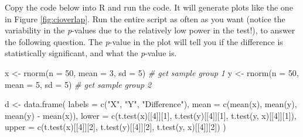 \documentclass[
]{krantz}
\newenvironment{Shaded}{\begin{snugshade}}{\end{snugshade}}
\newcommand{\AttributeTok}[1]{\textcolor[rgb]{0.77,0.63,0.00}{#1}}
\newcommand{\CommentTok}[1]{\textcolor[rgb]{0.56,0.35,0.01}{\textit{#1}}}
\newcommand{\DecValTok}[1]{\textcolor[rgb]{0.00,0.00,0.81}{#1}}
\newcommand{\FunctionTok}[1]{\textcolor[rgb]{0.00,0.00,0.00}{#1}}
\newcommand{\NormalTok}[1]{#1}
\newcommand{\OtherTok}[1]{\textcolor[rgb]{0.56,0.35,0.01}{#1}}
\newcommand{\SpecialCharTok}[1]{\textcolor[rgb]{0.00,0.00,0.00}{#1}}
\newcommand{\StringTok}[1]{\textcolor[rgb]{0.31,0.60,0.02}{#1}}
\begin{document}
Copy the code below into R and run the code. It will generate plots like the one in Figure \ref{fig:cioverlap}. Run the entire script as often as you want (notice the variability in the \emph{p}-values due to the relatively low power in the test!), to answer the following question. The \emph{p}-value in the plot will tell you if the difference is statistically significant, and what the \emph{p}-value is.

\begin{Shaded}
\begin{Highlighting}[]
\NormalTok{x }\OtherTok{\textless{}{-}} \FunctionTok{rnorm}\NormalTok{(}\AttributeTok{n =} \DecValTok{50}\NormalTok{, }\AttributeTok{mean =} \DecValTok{3}\NormalTok{, }\AttributeTok{sd =} \DecValTok{5}\NormalTok{) }\CommentTok{\# get sample group 1}
\NormalTok{y }\OtherTok{\textless{}{-}} \FunctionTok{rnorm}\NormalTok{(}\AttributeTok{n =} \DecValTok{50}\NormalTok{, }\AttributeTok{mean =} \DecValTok{5}\NormalTok{, }\AttributeTok{sd =} \DecValTok{5}\NormalTok{) }\CommentTok{\# get sample group 2}

\NormalTok{d }\OtherTok{\textless{}{-}} \FunctionTok{data.frame}\NormalTok{(}
  \AttributeTok{labels =} \FunctionTok{c}\NormalTok{(}\StringTok{"X"}\NormalTok{, }\StringTok{"Y"}\NormalTok{, }\StringTok{"Difference"}\NormalTok{),}
  \AttributeTok{mean =} \FunctionTok{c}\NormalTok{(}\FunctionTok{mean}\NormalTok{(x), }\FunctionTok{mean}\NormalTok{(y), }\FunctionTok{mean}\NormalTok{(y) }\SpecialCharTok{{-}} \FunctionTok{mean}\NormalTok{(x)),}
  \AttributeTok{lower =} \FunctionTok{c}\NormalTok{(}\FunctionTok{t.test}\NormalTok{(x)[[}\DecValTok{4}\NormalTok{]][}\DecValTok{1}\NormalTok{], }\FunctionTok{t.test}\NormalTok{(y)[[}\DecValTok{4}\NormalTok{]][}\DecValTok{1}\NormalTok{], }\FunctionTok{t.test}\NormalTok{(y, x)[[}\DecValTok{4}\NormalTok{]][}\DecValTok{1}\NormalTok{]),}
  \AttributeTok{upper =} \FunctionTok{c}\NormalTok{(}\FunctionTok{t.test}\NormalTok{(x)[[}\DecValTok{4}\NormalTok{]][}\DecValTok{2}\NormalTok{], }\FunctionTok{t.test}\NormalTok{(y)[[}\DecValTok{4}\NormalTok{]][}\DecValTok{2}\NormalTok{], }\FunctionTok{t.test}\NormalTok{(y, x)[[}\DecValTok{4}\NormalTok{]][}\DecValTok{2}\NormalTok{])}
\NormalTok{)}


\end{Highlighting}
\end{Shaded}
\end{document}

